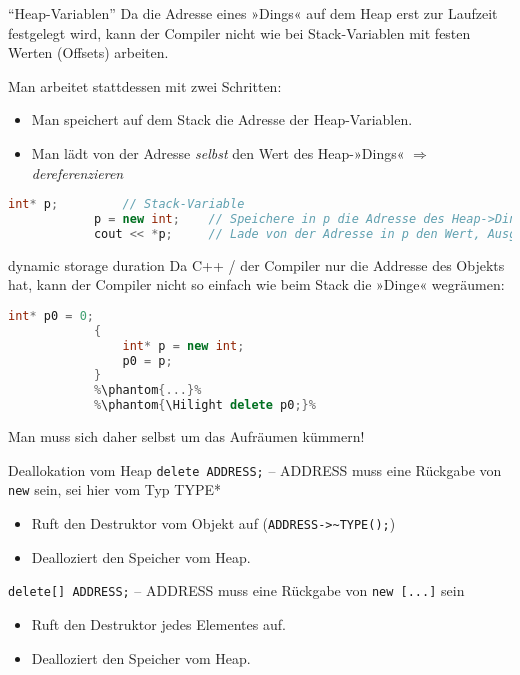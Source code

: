 \begin{frame}[fragile]{\enquote{Heap-Variablen}}
	Da die Adresse eines »Dings« auf dem Heap erst zur Laufzeit festgelegt wird, kann der Compiler nicht wie bei Stack-Variablen mit festen Werten (Offsets) arbeiten.
	
	\hspace{1em}
	\pause
	
	Man arbeitet stattdessen mit zwei Schritten:
	\begin{itemize}
		\item Man speichert auf dem Stack die Adresse der Heap-Variablen.
		\item Man lädt von der Adresse \emph{selbst} den Wert des Heap-»Dings« $\Rightarrow$ \emph{dereferenzieren}
	\end{itemize}
	\pause
	
	\footnotesize
	\begin{block}{}
		\begin{lstlisting}[language=C++]
			int* p;         // Stack-Variable
			p = new int;    // Speichere in p die Adresse des Heap->Dings<.
			cout << *p;     // Lade von der Adresse in p den Wert, Ausgabe.
		\end{lstlisting}
	\end{block}
\end{frame}

\begin{frame}[fragile]{dynamic storage duration}
	Da C++ / der Compiler nur die Addresse des Objekts hat, kann der Compiler nicht so einfach wie beim Stack die »Dinge« wegräumen:
	
	{\footnotesize
	\begin{block}{}
		\begin{lstlisting}[language=C++, escapechar=\%]
			int* p0 = 0;
			{
			    int* p = new int;
			    p0 = p;
			}
			%\phantom{...}%
			%\phantom{\Hilight delete p0;}%
		\end{lstlisting}
	\end{block}
	}
	
	Man muss sich daher selbst um das Aufräumen kümmern!
\end{frame}

\begin{frame}[fragile]{Deallokation vom Heap}
	\verb|delete ADDRESS;| -- ADDRESS muss eine Rückgabe von \verb|new| sein, sei hier vom Typ TYPE*
	\begin{itemize}
		\item Ruft den Destruktor vom Objekt auf (\verb|ADDRESS->~TYPE();|)
		\item Dealloziert den Speicher vom Heap.
	\end{itemize}
	
	\vspace{2em}
	
	\verb|delete[] ADDRESS;| -- ADDRESS muss eine Rückgabe von \verb|new [...]| sein
	\begin{itemize}
		\item Ruft den Destruktor jedes Elementes auf.
		\item Dealloziert den Speicher vom Heap.
	\end{itemize}
\end{frame}

